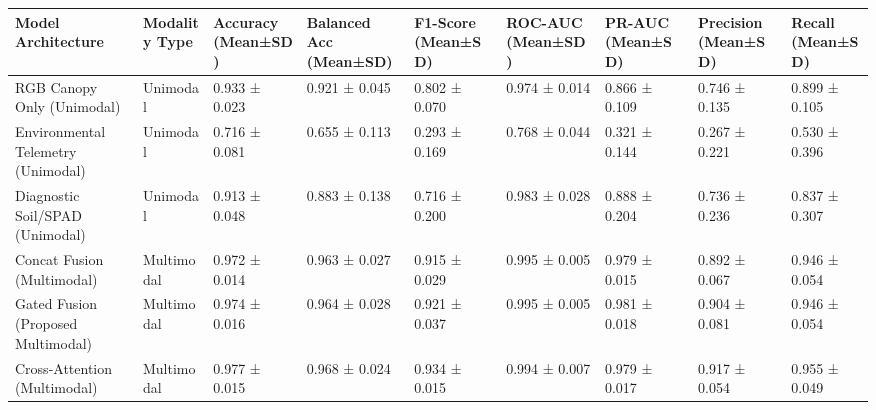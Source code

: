 \begin{tabular}{lllllllll}
\toprule
Model Architecture & Modality Type & Accuracy (Mean±SD) & Balanced Acc (Mean±SD) & F1-Score (Mean±SD) & ROC-AUC (Mean±SD) & PR-AUC (Mean±SD) & Precision (Mean±SD) & Recall (Mean±SD) \\
\midrule
RGB Canopy Only (Unimodal) & Unimodal & 0.933 ± 0.023 & 0.921 ± 0.045 & 0.802 ± 0.070 & 0.974 ± 0.014 & 0.866 ± 0.109 & 0.746 ± 0.135 & 0.899 ± 0.105 \\
Environmental Telemetry (Unimodal) & Unimodal & 0.716 ± 0.081 & 0.655 ± 0.113 & 0.293 ± 0.169 & 0.768 ± 0.044 & 0.321 ± 0.144 & 0.267 ± 0.221 & 0.530 ± 0.396 \\
Diagnostic Soil/SPAD (Unimodal) & Unimodal & 0.913 ± 0.048 & 0.883 ± 0.138 & 0.716 ± 0.200 & 0.983 ± 0.028 & 0.888 ± 0.204 & 0.736 ± 0.236 & 0.837 ± 0.307 \\
Concat Fusion (Multimodal) & Multimodal & 0.972 ± 0.014 & 0.963 ± 0.027 & 0.915 ± 0.029 & 0.995 ± 0.005 & 0.979 ± 0.015 & 0.892 ± 0.067 & 0.946 ± 0.054 \\
Gated Fusion (Proposed Multimodal) & Multimodal & 0.974 ± 0.016 & 0.964 ± 0.028 & 0.921 ± 0.037 & 0.995 ± 0.005 & 0.981 ± 0.018 & 0.904 ± 0.081 & 0.946 ± 0.054 \\
Cross-Attention (Multimodal) & Multimodal & 0.977 ± 0.015 & 0.968 ± 0.024 & 0.934 ± 0.015 & 0.994 ± 0.007 & 0.979 ± 0.017 & 0.917 ± 0.054 & 0.955 ± 0.049 \\
\bottomrule
\end{tabular}

